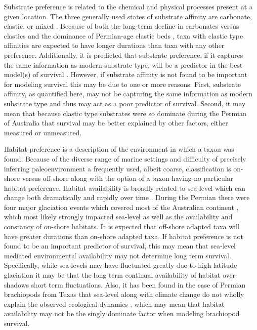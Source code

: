 \documentclass[12pt,letterpaper]{article}
\begin{document}
Substrate preference is related to the chemical and physical processes present at a given location. The three generally used states of substrate affinity are carbonate, clastic, or mixed \citep{Foote2006,Anderson2011a,Nurnberg2013a,Kiessling2007a,Miller2001}. Because of both the long-term decline in carbonates versus clastics \citep{Peters2008} and the dominance of Permian-age clastic beds \citep{Birgenheier2010,Percival2012,Thomas2007,Fielding2008a,Fielding2008}, taxa with clastic type affinities are expected to have longer durations than taxa with any other preference. Additionally, it is predicted that substrate preference, if it captures the same information as modern substrate type, will be a predictor in the best model(s) of survival \citep{Richardson1997,Richardson1997a}. However, if substrate affinity is not found to be important for modeling survival this may be due to one or more reasons. First, substrate affinity, as quantified here, may not be capturing the same information as modern substrate type and thus may act as a poor predictor of survival. Second, it may mean that because clastic type substrates were so dominate during the Permian of Australia that survival may be better explained by other factors, either measured or unmeasured. 

Habitat preference is a description of the environment in which a taxon was found. Because of the diverse range of marine settings and difficulty of precisely inferring paleoenvironment a frequently used, albeit coarse, classification is on-shore versus off-shore \citep{Sepkoski1991,Kiessling2007a,Bottjer1988,Jablonski1991,Jablonski1983b} along with the option of a taxon having no particular habitat preference. Habitat availability is broadly related to sea-level which can change both dramatically and rapidly over time \citep{Olszewski2004}. During the Permian there were four major glaciation events which covered most of the Australian continent \citep{Fielding2008,Birgenheier2010,Fielding2008a,Fielding2006}, which most likely strongly impacted sea-level as well as the availability and constancy of on-shore habitats. It is expected that off-shore adapted taxa will have greater durations than on-shore adapted taxa. If habitat preference is not found to be an important predictor of survival, this may mean that sea-level mediated environmental availability may not determine long term survival. Specifically, while sea-levels may have fluctuated greatly due to high latitude glaciation \citep{Fielding2008,Fielding2008a,Birgenheier2010} it may be that the long term continual availability of habitat over-shadows short term fluctuations. Also, it has been found in the case of Permian brachiopods from Texas that sea-level along with climate change do not wholly explain the observed ecological dynamics \citep{Olszewski2004}, which may mean that habitat availability may not be the singly dominate factor when modeling brachiopod survival. 
\end{document}
